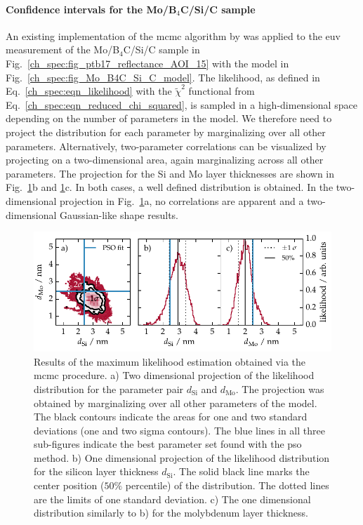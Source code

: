 \paragraph{Confidence intervals for the Mo/B$_4$C/Si/C sample}
An existing implementation of the \gls{mcmc} algorithm by \textcite{foreman-mackey_emcee:_2013} was applied to the \gls{euv} measurement of the Mo/B$_4$C/Si/C sample in Fig.~\ref{ch_spec:fig_ptb17_reflectance_AOI_15} with the model in Fig.~\ref{ch_spec:fig_Mo_B4C_Si_C_model}. The likelihood, as defined in Eq.~\eqref{ch_spec:eqn_likelihood} with the $\tilde{\chi}^2$ functional from Eq.~\eqref{ch_spec:eqn_reduced_chi_squared}, is sampled in a high-dimensional space depending on the number of parameters in the model. We therefore need to project the distribution for each parameter by marginalizing over all other parameters. Alternatively, two-parameter correlations can be visualized by projecting on a two-dimensional area, again marginalizing across all other parameters. The projection for the Si and Mo layer thicknesses are shown in Fig.~\ref{ch_spec:fig_ptb17_MCMC_d_Mo_vs_d_Si}b and \ref{ch_spec:fig_ptb17_MCMC_d_Mo_vs_d_Si}c. In both cases, a well defined distribution is obtained. In the two-dimensional projection in Fig.~\ref{ch_spec:fig_ptb17_MCMC_d_Mo_vs_d_Si}a, no correlations are apparent and a two-dimensional Gaussian-like shape results.
\begin{figure}[htbp]
\centering
\includegraphics{img/PTB17_MCMC_d_Mo_vs_d_Si}
\caption[Results of the maximum likelihood estimation for Mo and Si thicknesses of the Mo/B$_4$C/Si/C sample.]{Results of the maximum likelihood estimation obtained via the \gls{mcmc} procedure. a) Two dimensional projection of the likelihood distribution for the parameter pair $d_\text{Si}$ and $d_\text{Mo}$. The projection was obtained by marginalizing over all other parameters of the model. The black contours indicate the areas for one and two standard deviations (one and two sigma contours). The blue lines in all three sub-figures indicate the best parameter set found with the \gls{pso} method. b) One dimensional projection of the likelihood distribution for the silicon layer thickness $d_\text{Si}$. The solid black line marks the center position ($50\%$ percentile) of the distribution. The dotted lines are the limits of one standard deviation. c) The one dimensional distribution similarly to b) for the molybdenum layer thickness.}
\label{ch_spec:fig_ptb17_MCMC_d_Mo_vs_d_Si}
\end{figure}
